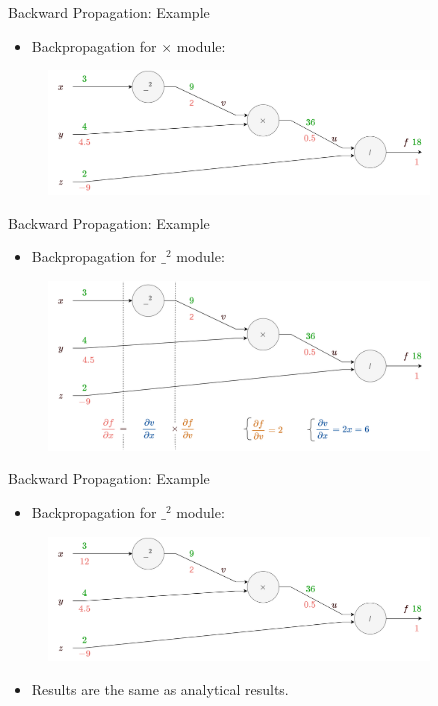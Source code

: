 \documentclass[compress,oilve,t]{beamer}
\begin{document}
\begin{frame}{Backward Propagation: Example}
	\begin{itemize}
		\item Backpropagation for $\times$ module:
	\end{itemize}
	\begin{figure}[H]
		\centering
		\includegraphics[width=0.9\textwidth]{Figs/backprop_e6.png}
	\end{figure}
\end{frame}

\begin{frame}{Backward Propagation: Example}
	\begin{itemize}
		\item Backpropagation for ${\_}^2$ module:
	\end{itemize}
	\begin{figure}[H]
		\centering
		\includegraphics[width=0.9\textwidth]{Figs/backprop_e7.png}
	\end{figure}
\end{frame}

\begin{frame}{Backward Propagation: Example}
	\begin{itemize}
		\item Backpropagation for ${\_}^2$ module:
	\end{itemize}
	\begin{figure}[H]
		\centering
		\includegraphics[width=0.9\textwidth]{Figs/backprop_e8.png}
	\end{figure}
	\begin{itemize}
		\item Results are the same as analytical results.
	\end{itemize}
\end{frame}
\end{document}

